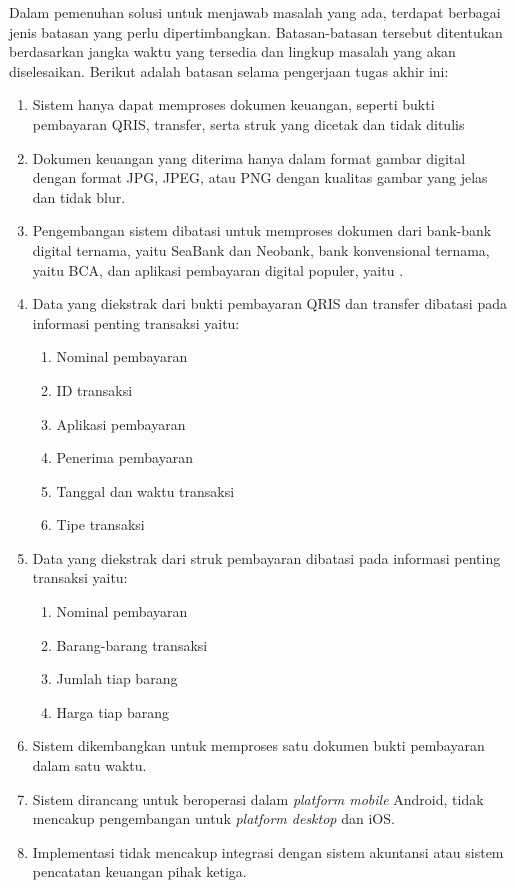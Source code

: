 Dalam pemenuhan solusi untuk menjawab masalah yang ada, terdapat berbagai jenis batasan yang perlu dipertimbangkan. Batasan-batasan tersebut ditentukan berdasarkan jangka waktu yang tersedia dan lingkup masalah yang akan diselesaikan. Berikut adalah batasan selama pengerjaan tugas akhir ini:
\begin{enumerate}
	\item Sistem hanya dapat memproses dokumen keuangan, seperti bukti pembayaran QRIS, transfer, serta struk yang dicetak dan tidak ditulis
	\item Dokumen keuangan yang diterima hanya dalam format gambar digital dengan format JPG, JPEG, atau PNG dengan kualitas gambar yang jelas dan tidak blur.
	\item  Pengembangan sistem dibatasi untuk memproses dokumen dari bank-bank digital ternama, yaitu SeaBank dan Neobank, bank konvensional ternama, yaitu BCA, dan aplikasi pembayaran digital populer, yaitu \gopay{}.
	\item Data yang diekstrak dari bukti pembayaran QRIS dan transfer dibatasi pada informasi penting transaksi yaitu:
	      \begin{enumerate}
		      \item Nominal pembayaran
		      \item ID transaksi
		      \item Aplikasi pembayaran
		      \item Penerima pembayaran
		      \item Tanggal dan waktu transaksi
		      \item Tipe transaksi
	      \end{enumerate}
	\item Data yang diekstrak dari struk pembayaran dibatasi pada informasi penting transaksi yaitu:
	      \begin{enumerate}
		      \item Nominal pembayaran
		      \item Barang-barang transaksi
		      \item Jumlah tiap barang 
		      \item Harga tiap barang
	      \end{enumerate}
	\item Sistem dikembangkan untuk memproses satu dokumen bukti pembayaran dalam satu waktu.
	\item Sistem dirancang untuk beroperasi dalam \emph{platform mobile} Android, tidak mencakup pengembangan untuk \emph{platform desktop} dan iOS.
	\item Implementasi tidak mencakup integrasi dengan sistem akuntansi atau sistem pencatatan keuangan pihak ketiga.

\end{enumerate}
